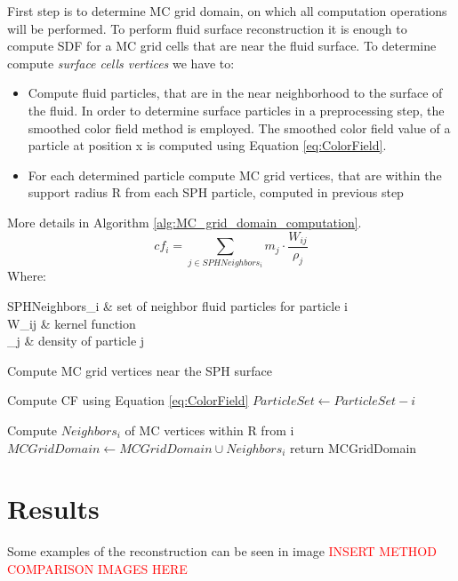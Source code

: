 First step is to determine MC grid domain, on which all computation operations will be performed. To perform fluid surface reconstruction it is enough to compute SDF for a MC grid cells that are near the fluid surface. To determine compute \emph{surface cells vertices} we have to:
\begin{itemize}
		\item Compute fluid particles, that are in the near neighborhood to the surface of the fluid. In order to determine surface particles in a preprocessing step, the smoothed color field method \cite{ColorField} is employed.  The smoothed color field value of a particle at position x is computed using Equation \ref{eq:ColorField}.
		\item For each determined particle compute MC grid vertices, that are within the support radius R from each SPH particle, computed in previous step 
\end{itemize}
More details in Algorithm \ref{alg:MC_grid_domain_computation}.
\begin{equation} \label{eq:ColorField}
	cf_i = \sum_{j\in SPHNeighbors_i}{m_j \cdot \dfrac{W_{ij}}{\rho_j}}
\end{equation}
Where:
\begin{conditions}
	SPHNeighbors_i & set of neighbor fluid particles for particle i\\
	W_{ij} & kernel function\\
	\rho_j & density of particle j\\
\end{conditions}
\begin{algorithm}
	\caption{Compute MC grid vertices near the SPH surface}
	\label{alg:MC_grid_domain_computation}
	\begin{algorithmic}
			\State Compute CF using Equation \ref{eq:ColorField}
				\State $ParticleSet \gets ParticleSet - i$
			\EndIf

		\EndFor
			\State Compute $Neighbors_i$ of MC vertices within R from  i
			\State $MCGridDomain \gets MCGridDomain \cup Neighbors_i$
		\EndFor
		\State return MCGridDomain
	\end{algorithmic}
\end{algorithm} 

\section{Results}

Some examples of the reconstruction can be seen in image \textcolor{red}{INSERT METHOD COMPARISON IMAGES HERE}